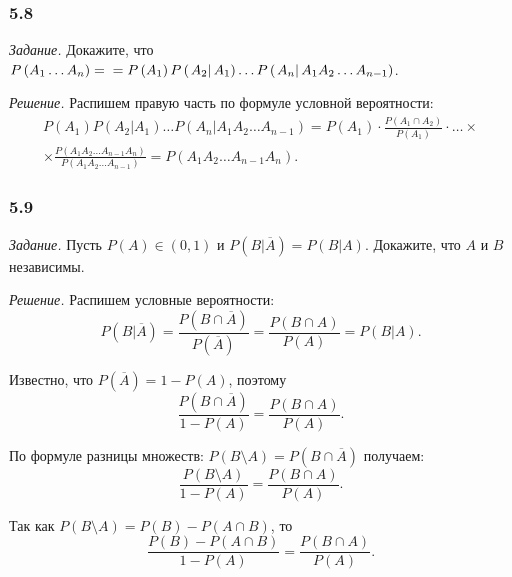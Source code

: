 \subsubsection*{5.8}

\textit{Задание.} Докажите, что
$P \left( A_1 \dotsc A_n \right) = \\
= P \left( A_1 \right) P \left( \left. A_2 \right| A_1 \right) \dotsc P \left( \left. A_n \right| A_1 A_2 \dotsc A_{n-1} \right) $.

\textit{Решение.} Распишем правую часть по формуле условной вероятности:
\begin{equation*}
\begin{split}
P \left( A_1 \right) P \left( \left. A_2 \right| A_1 \right) \dotsc P \left( \left. A_n \right| A_1 A_2 \dotsc A_{n-1} \right) =
P \left( A_1 \right) \cdot
\frac{P \left( A_1 \cap A_2 \right) }{P \left( A_1 \right) } \cdot
\dotsc \times \\
\times \frac{P \left( A_1 A_2 \dotsc A_{n-1} A_n \right) }{P \left( A_1 A_2 \dotsc A_{n-1} \right) } =
P \left( A_1 A_2 \dotsc A_{n-1} A_n \right).
\end{split}
\end{equation*}

\subsubsection*{5.9}

\textit{Задание.}
Пусть $P \left( A \right) \in \left( 0,1 \right) $ и $P \left( \left. B \right| \overline{A} \right) = P \left( \left. B \right| A \right) $.
Докажите, что $A$ и $B$ независимы.

\textit{Решение.} Распишем условные вероятности:
$$P \left( \left. B \right| \overline{A} \right) =
\frac{P \left( B \cap \overline{A} \right) }{P \left( \overline{A} \right) } =
\frac{P \left( B \cap A \right)}{P \left( A \right) } =
P \left( \left. B \right| A \right).$$

Известно, что $P \left( \overline{A} \right) = 1 - P \left( A \right) $, поэтому
$$\frac{P \left( B \cap \overline{A} \right) }{1 - P \left( A \right) } =
\frac{P \left( B \cap A \right)}{P \left( A \right) }.$$

По формуле разницы множеств: $P \left( B \setminus A \right) = P \left( B \cap \overline{A} \right) $ получаем:
$$\frac{P \left( B \setminus A \right) }{1 - P \left( A \right) } =
\frac{P \left( B \cap A \right)}{P \left( A \right) }.$$

Так как $P \left( B \setminus A \right) = P \left( B \right) - P \left( A \cap B \right) $, то
$$\frac{P \left( B \right) - P \left( A \cap B \right) }{1 - P \left( A \right) } =
\frac{P \left( B \cap A \right)}{P \left( A \right) }.$$

